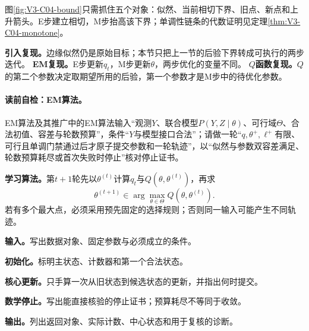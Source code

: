 \label{struct:V3-C04-CH17}
\begingroup
\fontsize{10pt}{12pt}\selectfont

\endgroup
图\ref{fig:V3-C04-bound}只需抓住五个对象：似然、当前相切下界、旧点、新点和上升箭头。E步建立相切，M步抬高该下界；单调性链条的代数证明见定理\ref{thm:V3-C04-monotone}。


\label{replay:V3-C04-S03-SLM-09-01-001}
\textbf{引入复现。}边缘似然仍是原始目标；本节只把上一节的后验下界转成可执行的两步迭代。
\label{replay:V3-C04-S03-SLM-09-01-002}
\textbf{EM复现。}E步更新$q_t$，M步更新$\theta$，两步优化的变量不同。
\label{replay:V3-C04-S03-SLM-09-01-003}
\textbf{$Q$函数复现。}$Q$的第二个参数决定取期望所用的后验，第一个参数才是M步中的待优化参数。

\paragraph{读前自检：EM算法。}EM算法及其推广中的EM算法输入“观测$Y$、联合模型$P(Y,Z\mid\theta)$、可行域$\Theta$、合法初值、容差与轮数预算”，条件“$Y$与模型接口合法”；请做一轮“$q,\theta^+,\ell^+$有限、可行且单调门禁通过后才原子提交参数和一轮轨迹”，以“似然与参数双容差满足、轮数预算耗尽或首次失败时停止”核对停止证书。\par

\label{struct:V3-C04-CH10}
\textbf{学习算法。}第$t+1$轮先以$\theta^{(t)}$计算$q_t$与$Q(\theta,\theta^{(t)})$，再求
\[
\theta^{(t+1)}\in\arg\max_{\theta\in\Theta}Q(\theta,\theta^{(t)}).
\]
若有多个最大点，必须采用预先固定的选择规则；否则同一输入可能产生不同轨迹。

\label{struct:V3-C04-CH19}
\label{struct:V3-C04-CH20}

\begin{keypointbox}[title={EM算法：五步阅读}]
\textbf{输入。}写出数据对象、固定参数与必须成立的条件。\par
\textbf{初始化。}标明主状态、计数器和第一个合法状态。\par
\textbf{核心更新。}只手算一次从旧状态到候选状态的更新，并指出何时提交。\par
\textbf{数学停止。}写出能直接核验的停止证书；预算耗尽不等同于收敛。\par
\textbf{输出。}列出返回对象、实际计数、中心状态和用于复核的诊断。
\end{keypointbox}

